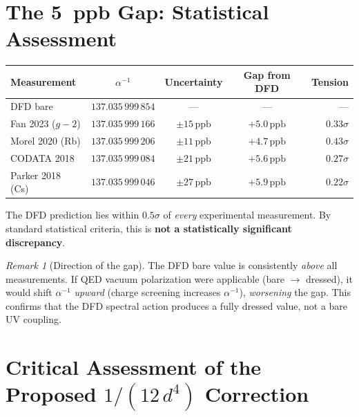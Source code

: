 \documentclass[12pt,a4paper]{article}
\theoremstyle{definition}
\theoremstyle{remark}
\newtheorem{remark}{Remark}
\newcommand{\inv}{^{-1}}
\newcommand{\ppb}{\,\mathrm{ppb}}
\begin{document}
\section{The 5~ppb Gap: Statistical Assessment}
\label{sec:gap}

\begin{center}
\renewcommand{\arraystretch}{1.3}
\begin{tabular}{lcccr}
\toprule
\textbf{Measurement} & $\alpha\inv$ & \textbf{Uncertainty} &
\textbf{Gap from DFD} & \textbf{Tension} \\
\midrule
DFD bare & $137.035\,999\,854$ & --- & --- & --- \\
\midrule
Fan 2023 ($g{-}2$) & $137.035\,999\,166$ & $\pm 15\ppb$ & $+5.0\ppb$ & $0.33\sigma$ \\
Morel 2020 (Rb) & $137.035\,999\,206$ & $\pm 11\ppb$ & $+4.7\ppb$ & $0.43\sigma$ \\
CODATA 2018 & $137.035\,999\,084$ & $\pm 21\ppb$ & $+5.6\ppb$ & $0.27\sigma$ \\
Parker 2018 (Cs) & $137.035\,999\,046$ & $\pm 27\ppb$ & $+5.9\ppb$ & $0.22\sigma$ \\
\bottomrule
\end{tabular}
\end{center}

\medskip

The DFD prediction lies within $0.5\sigma$ of \emph{every} experimental
measurement. By standard statistical criteria, this is
\textbf{not a statistically significant discrepancy}.

\begin{remark}[Direction of the gap]
The DFD bare value is consistently \emph{above} all measurements. If QED
vacuum polarization were applicable (bare $\to$ dressed), it would shift
$\alpha\inv$ \emph{upward} (charge screening increases $\alpha\inv$),
\emph{worsening} the gap. This confirms that the DFD spectral action
produces a fully dressed value, not a bare UV coupling.
\end{remark}

\section{Critical Assessment of the Proposed $1/(12\,d^4)$ Correction}
\label{sec:critical}
\end{document}
